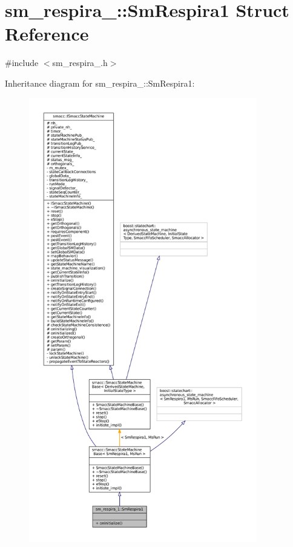 \hypertarget{structsm__respira__1_1_1SmRespira1}{}\section{sm\+\_\+respira\+\_\+:\+:Sm\+Respira1 Struct Reference}
\label{structsm__respira__1_1_1SmRespira1}


{\ttfamily \#include $<$sm\+\_\+respira\+\_.\+h$>$}



Inheritance diagram for sm\+\_\+respira\+\_\+:\+:Sm\+Respira1\+:
\nopagebreak
\begin{figure}[H]
\begin{center}
\leavevmode
\includegraphics[height=550pt]{structsm__respira__1_1_1SmRespira1__inherit__graph}
\end{center}
\end{figure}


